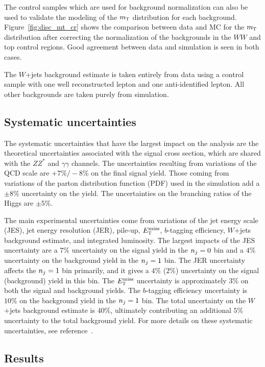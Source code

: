 The control samples which are used for background normalization can also be used to validate the modeling of the $m_{\textrm{\footnotesize\sc t}}$ distribution for each background. Figure~\ref{fig:disc_mt_cr} shows the comparison between data and MC for the $m_{\textrm{\footnotesize\sc t}}$ distribution after correcting the normalization of the backgrounds in the $WW$ and top control regions. Good agreement between data and simulation is seen in both cases. 

The $W$+jets background estimate is taken entirely from data using a control sample with one well reconstructed lepton and one anti-identified lepton. All other backgrounds are taken purely from simulation. 

\subsection{Systematic uncertainties}

The systematic uncertainties that have the largest impact on the analysis are the theoretical uncertainties associated with the signal cross section, which are shared with the $ZZ^*$ and $\gamma\gamma$ channels. The uncertainties resulting from variations of the QCD scale are $+7\%/-8\%$ on the final signal yield. Those coming from variations of the parton distribution function (PDF) used in the simulation add a $\pm 8\%$ uncertainty on the yield. The uncertainties on the branching ratios of the Higgs are $\pm 5\%$. 

The main experimental uncertainties come from variations of the jet energy scale (JES), jet energy resolution (JER), pile-up, $E_{\textrm{\footnotesize\sc t}}^{\rm miss}$, $b$-tagging efficiency, $W$+jets background estimate, and integrated luminosity. The largest impacts of the JES uncertainty are a $7\%$ uncertainty on the signal yield in the $n_j = 0$ bin and a $4\%$ uncertainty on the background yield in the $n_j = 1$ bin. The JER uncertainty affects the $n_j = 1$ bin primarily, and it gives a $4\%$ ($2\%$) uncertainty on the signal (background) yield in this bin. The $E_{\textrm{\footnotesize\sc t}}^{\rm miss}$ uncertainty is approximately $3\%$ on both the signal and background yields. The $b$-tagging efficiency uncertainty is $10\%$ on the background yield in the $n_j = 1$ bin. The total uncertainty on the $W$+jets background estimate is $40\%$, ultimately contributing an additional $5\%$ uncertainty to the total background yield.  For more details on these systematic uncertainties, see reference~\cite{Discovery}.  

\subsection{Results}

